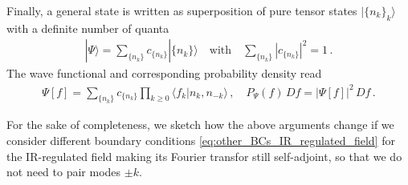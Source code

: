 \documentclass[../QFT_main.tex]{subfiles}
\begin{document}
\begin{mytheorem}
Finally, a general state is written as superposition of pure tensor states $|\{n_k\}_k\rangle$ with a definite number of quanta
\begin{align}
    |\Psi\rangle = \sum_{\{n_k\}} c_{\{n_k\}} | \{n_k\} \rangle\quad\text{with}\quad\sum_{\{n_k\}} |c_{\{n_k\}}|^2 = 1\,.
\end{align} 
The wave functional and corresponding probability density read
\begin{align}
    \Psi[f] = \sum_{\{n_k\}} c_{\{n_k\}} \prod_{k\geq0} \langle f_k | n_{k},n_{-k} \rangle\,,\quad
    P_{\Psi}(f)\, Df = |\Psi[f]|^2 \,Df\,.
\end{align}
%
\end{mytheorem}


\begin{mytheorem}
%
For the sake of completeness, we sketch how the above arguments change if we consider different boundary conditions \eqref{eq:other_BCs_IR_regulated_field} for the IR-regulated field making its Fourier transfor still self-adjoint, so that we do not need to pair modes $\pm k$.
\end{mytheorem}
\end{document}
